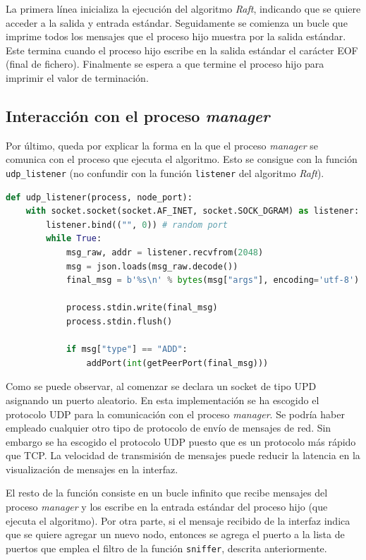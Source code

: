 La primera línea inicializa la ejecución del algoritmo \textit{Raft}, indicando que se quiere acceder a la salida y entrada estándar. Seguidamente se comienza un bucle que imprime todos los mensajes que el proceso hijo muestra por la salida estándar. Este termina cuando el proceso hijo escribe en la salida estándar el carácter EOF (final de fichero). Finalmente se espera a que termine el proceso hijo para imprimir el valor de terminación.

\subsection{Interacción con el proceso \textit{manager}}

Por último, queda por explicar la forma en la que el proceso \textit{manager} se comunica con el proceso que ejecuta el algoritmo. Esto se consigue con la función \texttt{udp\_listener} (no confundir con la función \texttt{listener} del algoritmo \textit{Raft}).

\begin{lstlisting}[language=Python]
def udp_listener(process, node_port):
    with socket.socket(socket.AF_INET, socket.SOCK_DGRAM) as listener:
        listener.bind(("", 0)) # random port
        while True:
            msg_raw, addr = listener.recvfrom(2048)
            msg = json.loads(msg_raw.decode())
            final_msg = b'%s\n' % bytes(msg["args"], encoding='utf-8')
            
            process.stdin.write(final_msg)
            process.stdin.flush()
            
            if msg["type"] == "ADD":
                addPort(int(getPeerPort(final_msg)))
\end{lstlisting}

Como se puede observar, al comenzar se declara un socket de tipo UPD asignando un puerto aleatorio. En esta implementación se ha escogido el protocolo UDP para la comunicación con el proceso \textit{manager}. Se podría haber empleado cualquier otro tipo de protocolo de envío de mensajes de red. Sin embargo se ha escogido el protocolo UDP puesto que es un protocolo más rápido que TCP. La velocidad de transmisión de mensajes puede reducir la latencia en la visualización de mensajes en la interfaz.

El resto de la función consiste en un bucle infinito que recibe mensajes del proceso \textit{manager} y los escribe en la entrada estándar del proceso hijo (que ejecuta el algoritmo). Por otra parte, si el mensaje recibido de la interfaz indica que se quiere agregar un nuevo nodo, entonces se agrega el puerto a la lista de puertos que emplea el filtro de la función \texttt{sniffer}, descrita anteriormente.

